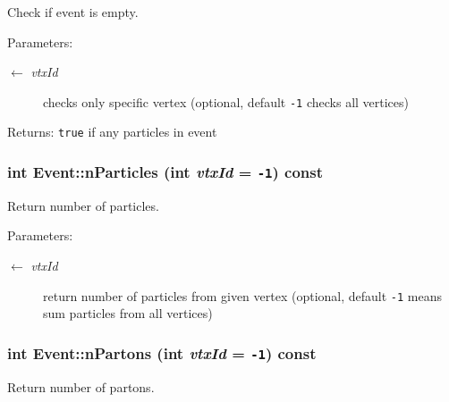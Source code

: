 Check if event is empty. 

\begin{Desc}
\item[Parameters:]
\begin{description}
\item[\mbox{$\leftarrow$} {\em vtx\-Id}]checks only specific vertex (optional, default {\tt -1} checks all vertices)\end{description}
\end{Desc}
\begin{Desc}
\item[Returns:]{\tt true} if any particles in event \end{Desc}
\hypertarget{classEvent_6cd988d4ea5b6312de8fd904de09517d}{
\subsubsection[nParticles]{\setlength{\rightskip}{0pt plus 5cm}int Event::n\-Particles (int {\em vtx\-Id} = {\tt -1}) const}}
\label{classEvent_6cd988d4ea5b6312de8fd904de09517d}


Return number of particles. 

\begin{Desc}
\item[Parameters:]
\begin{description}
\item[\mbox{$\leftarrow$} {\em vtx\-Id}]return number of particles from given vertex (optional, default {\tt -1} means sum particles from all vertices) \end{description}
\end{Desc}
\hypertarget{classEvent_96a2728447b5b15b31e9ca132f8f4eab}{
\subsubsection[nPartons]{\setlength{\rightskip}{0pt plus 5cm}int Event::n\-Partons (int {\em vtx\-Id} = {\tt -1}) const}}
\label{classEvent_96a2728447b5b15b31e9ca132f8f4eab}


Return number of partons. 

